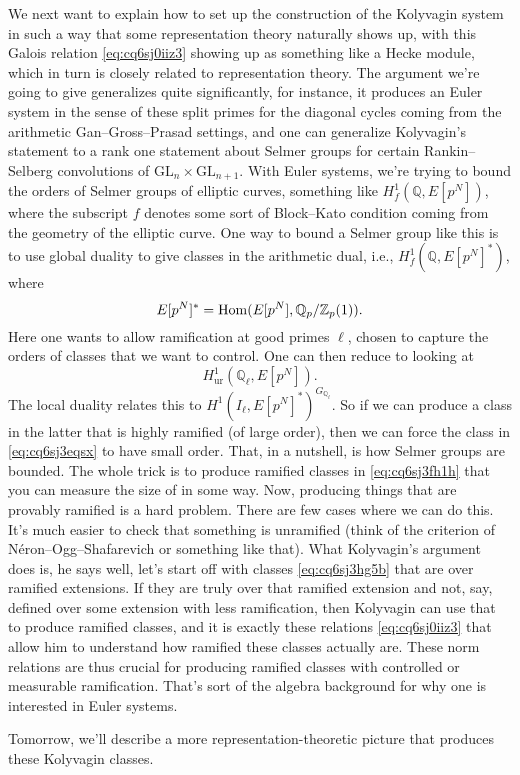 \documentclass[reqno]{amsart} 
\begin{document}
We next want to explain how to set up the construction of the Kolyvagin system in such a way that some representation theory naturally shows up, with this Galois relation \eqref{eq:cq6sj0iiz3} showing up as something like a Hecke module, which in turn is closely related to representation theory.  The argument we're going to give generalizes quite significantly, for instance, it produces an Euler system in the sense of these split primes for the diagonal cycles coming from the arithmetic Gan--Gross--Prasad settings, and one can generalize Kolyvagin's statement to a rank one statement about Selmer groups for certain Rankin--Selberg convolutions of $\mathrm{GL}_n \times\mathrm{GL}_{n + 1}$.  With Euler systems, we're trying to bound the orders of Selmer groups of elliptic curves, something like $H^1_f(\mathbb{Q}, E[p^N])$, where the subscript $f$ denotes some sort of Block--Kato condition coming from the geometry of the elliptic curve.  One way to bound a Selmer group like this is to use global duality to give classes in the arithmetic dual, i.e., $H_f^1(\mathbb{Q}, E[p^N]^\ast )$, where
\begin{equation}\label{eq:cq6sj3fh1h}
  E[p^N]^\ast = \operatorname{Hom}(E[p^N], \mathbb{Q}_p / \mathbb{Z}_p(1)).
\end{equation}
Here one wants to allow ramification at good primes $\ell$, chosen to capture the orders of classes that we want to control.  One can then reduce to looking at
\begin{equation}\label{eq:cq6sj3eqsx}
  H^1_{\mathrm{ur}}(\mathbb{Q}_{\ell}, E[p^N]).
\end{equation}
The local duality relates this to $H^1(I_{\ell}, E[p^N]^\ast)^{G_{\mathbb{Q}_{\ell}}}$.  So if we can produce a class in the latter that is highly ramified (of large order), then we can force the class in \eqref{eq:cq6sj3eqsx} to have small order.  That, in a nutshell, is how Selmer groups are bounded.  The whole trick is to produce ramified classes in \eqref{eq:cq6sj3fh1h} that you can measure the size of in some way.  Now, producing things that are provably ramified is a hard problem.  There are few cases where we can do this.  It's much easier to check that something is unramified (think of the criterion of Néron--Ogg--Shafarevich or something like that).  What Kolyvagin's argument does is, he says well, let's start off with classes \eqref{eq:cq6sj3hg5b} that are over ramified extensions.  If they are truly over that ramified extension and not, say, defined over some extension with less ramification, then Kolyvagin can use that to produce ramified classes, and it is exactly these relations \eqref{eq:cq6sj0iiz3} that allow him to understand how ramified these classes actually are.  These norm relations are thus crucial for producing ramified classes with controlled or measurable ramification.  That's sort of the algebra background for why one is interested in Euler systems.

Tomorrow, we'll describe a more representation-theoretic picture that produces these Kolyvagin classes.







{} 
\end{document}
